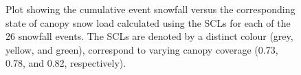 \documentclass[
  letterpaper,
  DIV=11,
  numbers=noendperiod]{scrartcl}
\begin{document}
\begin{figure}


\caption{\label{fig-scl-w-sf}Plot showing the cumulative event snowfall
versus the corresponding state of canopy snow load calculated using the
SCLs for each of the 26 snowfall events. The SCLs are denoted by a
distinct colour (grey, yellow, and green), correspond to varying canopy
coverage (0.73, 0.78, and 0.82, respectively).}

\end{figure}%

\pagebreak
{}
\end{document}
